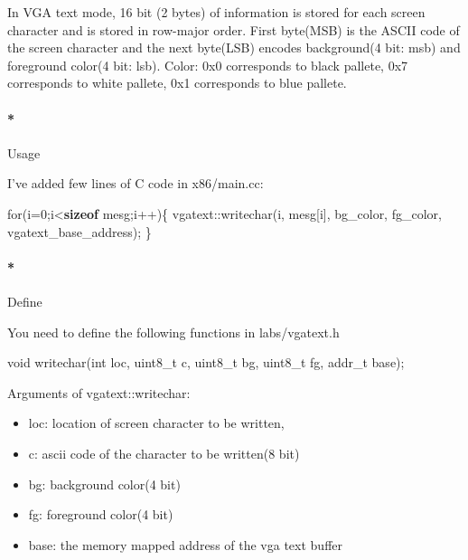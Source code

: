 \documentclass[]{article}
\newenvironment{Shaded}{}{}
\newcommand{\KeywordTok}[1]{\textbf{{#1}}}
\newcommand{\DataTypeTok}[1]{\textcolor[rgb]{0.50,0.00,0.00}{{#1}}}
\newcommand{\DecValTok}[1]{\textcolor[rgb]{0.00,0.00,1.00}{{#1}}}
\newcommand{\ControlFlowTok}[1]{{#1}}
\newcommand{\NormalTok}[1]{{#1}}
\providecommand{\tightlist}{%
  \setlength{\itemsep}{0pt}\setlength{\parskip}{0pt}}
\let\oldparagraph\paragraph
\renewcommand{\paragraph}[1]{\oldparagraph{#1}\mbox{}}
\begin{document}
In VGA text mode, 16 bit (2 bytes) of information is stored for each
screen character and is stored in row-major order. First byte(MSB) is
the ASCII code of the screen character and the next byte(LSB) encodes
background(4 bit: msb) and foreground color(4 bit: lsb). Color: 0x0
corresponds to black pallete, 0x7 corresponds to white pallete, 0x1
corresponds to blue pallete.

\paragraph*{Usage}\label{usage}

I've added few lines of C code in x86/main.cc:

\begin{Shaded}
\begin{Highlighting}[]
       \ControlFlowTok{for}\NormalTok{(i=}\DecValTok{0}\NormalTok{;i<}\KeywordTok{sizeof} \NormalTok{mesg;i++)\{}
         \NormalTok{vgatext::writechar(i, mesg[i], bg_color, fg_color, vgatext_base_address);}
       \NormalTok{\}}
\end{Highlighting}
\end{Shaded}

\paragraph*{Define}\label{define}

You need to define the following functions in labs/vgatext.h

\begin{Shaded}
\begin{Highlighting}[]
        \DataTypeTok{void} \NormalTok{writechar(}\DataTypeTok{int} \NormalTok{loc, }\DataTypeTok{uint8_t} \NormalTok{c, }\DataTypeTok{uint8_t} \NormalTok{bg, }\DataTypeTok{uint8_t} \NormalTok{fg, addr_t base);}
\end{Highlighting}
\end{Shaded}

Arguments of vgatext::writechar:

\begin{itemize}
\tightlist
\item
  loc: location of screen character to be written,
\item
  c: ascii code of the character to be written(8 bit)
\item
  bg: background color(4 bit)
\item
  fg: foreground color(4 bit)
\item
  base: the memory mapped address of the vga text buffer
\end{itemize}
\end{document}
